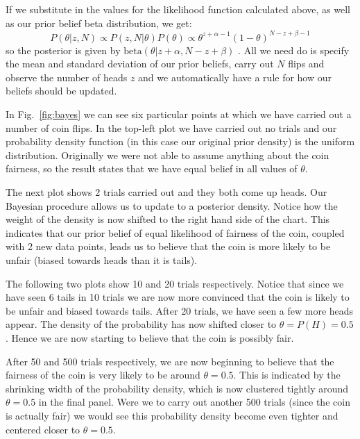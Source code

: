 If we substitute in the values for the likelihood function calculated above, as well as our prior belief beta distribution, we get:
\begin{equation}
  P(\theta|z,N)\propto P(z,N|\theta)P(\theta)\propto \theta^{z+\alpha - 1}(1-\theta)^{N-z+\beta -1} 
\end{equation}
so the posterior is given by $\textrm{beta}(\theta|z+\alpha,N-z+\beta)$ .
All we need do is specify the mean and standard deviation of our prior beliefs, carry out $N$ flips and observe the number of heads $z$ and we automatically have a rule for how our beliefs should be updated.

In Fig.~\ref{fig:bayes} we can see six particular points at which we have carried out a number of coin flips. In the top-left plot we have carried out no trials and our probability density function (in this case our original prior density) is the uniform distribution.
Originally we were not able to assume anything about the coin fairness, so the result states that we have equal belief in all values of $\theta$.

The next plot shows 2 trials carried out and they both come up heads. Our Bayesian procedure allows us to update to a posterior density. Notice how the weight of the density is now shifted to the right hand side of the chart. This indicates that our prior belief of equal likelihood of fairness of the coin, coupled with 2 new data points, leads us to believe that the coin is more likely to be unfair (biased towards heads than it is tails).

The following two plots show 10 and 20 trials respectively. Notice that since we have seen 6 tails in 10 trials we are now more convinced that the coin is likely to be unfair and biased towards tails. After 20 trials, we have seen a few more heads appear. The density of the probability has now shifted closer to $\theta = P(H) = 0.5$. Hence we are now starting to believe that the coin is possibly fair.

After 50 and 500 trials respectively, we are now beginning to believe that the fairness of the coin is very likely to be around $\theta=0.5$. This is indicated by the shrinking width of the probability density, which is now clustered tightly around $\theta=0.5$ in the final panel. Were we to carry out another 500 trials (since the coin is actually fair) we would see this probability density become even tighter and centered closer to $\theta=0.5$.


